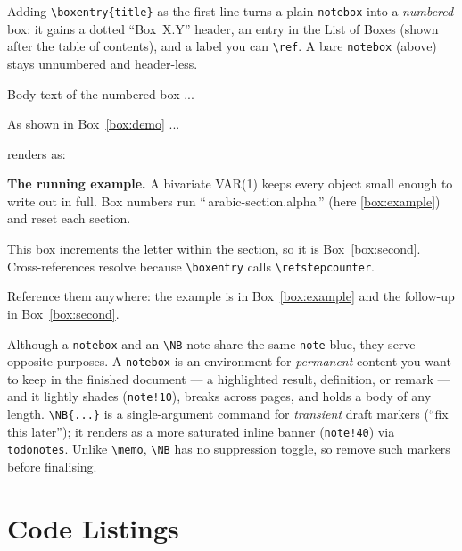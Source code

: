 \documentclass[11pt,a4paper]{article}
\begin{document}
Adding \verb|\boxentry{title}| as the first line turns a plain \verb|notebox| into a \emph{numbered} box: it gains a dotted ``Box~X.Y'' header, an entry in the List of Boxes (shown after the table of contents), and a label you can \verb|\ref|. A bare \verb|notebox| (above) stays unnumbered and header-less.

\begin{democode}
\begin{notebox}
    \label{box:demo}
    Body text of the numbered box ...
\end{notebox}
As shown in Box~\ref{box:demo} ...
\end{democode}

\noindent renders as:

\begin{notebox}
    \label{box:example}
    \textbf{The running example.} A bivariate VAR(1) keeps every object small enough to write out in full. Box numbers run ``\,arabic-section.alpha\,'' (here \ref{box:example}) and reset each section.
\end{notebox}

\begin{notebox}
    \label{box:second}
    This box increments the letter within the section, so it is Box~\ref{box:second}. Cross-references resolve because \verb|\boxentry| calls \verb|\refstepcounter|.
\end{notebox}

Reference them anywhere: the example is in Box~\ref{box:example} and the follow-up in Box~\ref{box:second}.

Although a \verb|notebox| and an \verb|\NB| note share the same \texttt{note} blue, they serve opposite purposes. A \verb|notebox| is an environment for \emph{permanent} content you want to keep in the finished document --- a highlighted result, definition, or remark --- and it lightly shades (\texttt{note!10}), breaks across pages, and holds a body of any length. \verb|\NB{...}| is a single-argument command for \emph{transient} draft markers (``fix this later''); it renders as a more saturated inline banner (\texttt{note!40}) via \texttt{todonotes}. Unlike \verb|\memo|, \verb|\NB| has no suppression toggle, so remove such markers before finalising.

\section{Code Listings}
\end{document}
